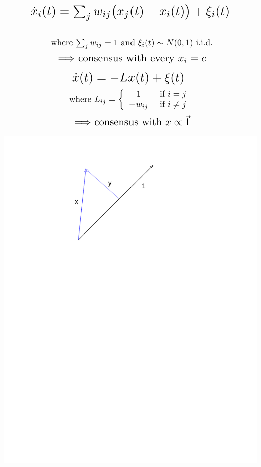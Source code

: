 \documentclass{beamer}
\begin{document}
\begin{frame}

\[ \scalebox{1.8}{$\dot{x}_i(t)=\sum_jw_{ij}\big(x_j(t)-x_i(t)\big)+\xi_i(t)$}\]
\\\[ \scalebox{1.25}{ where $\sum_jw_{ij} =1$ and $\xi_i(t)\sim N(0,1)$ i.i.d.} \]
\vspace{25pt}\[ \scalebox{1.5}{ $\Longrightarrow$ consensus with every $x_i=c$} \]

\end{frame}

\begin{frame}

\[ \scalebox{1.8}{$ \dot{x}(t)=-Lx(t)+\xi(t)$ }\]
\[\scalebox{1.25}{ where $L_{ij}=\left\{ \begin{array}{cccc} 1 & \text{ if } i=j \\ -w_{ij} & \text{ if } i\neq j \end{array}\right.$ }\]
\vspace{25pt}\[ \scalebox{1.5}{ $\Longrightarrow$ consensus with $x\propto \vec{1}$} \]
\end{frame}

\begin{frame}
\begin{center}
\includegraphics[scale=.8]{vectors.pdf}
\end{center}
\end{frame}
\end{document}
